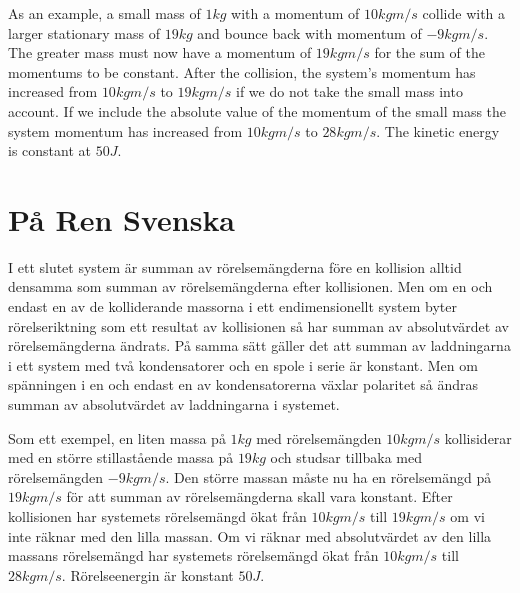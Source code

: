 As an example, a small mass of $1 kg$ with a momentum of $10 kgm/s$ collide with a larger stationary mass of $19 kg$ and bounce back with momentum of $-9 kgm/s$.
The greater mass must now have a momentum of $19 kgm/s$ for the sum of the momentums to be constant.
After the collision, the system's momentum has increased from $10 kgm/s$ to $19 kgm/s$ if we do not take the small mass into account.
If we include the absolute value of the momentum of the small mass the system momentum has increased from $10 kgm/s$ to $28 kgm/s$.
The kinetic energy is constant at $50 J$.

\section{På Ren Svenska}

I ett slutet system är summan av rörelsemängderna före en kollision alltid densamma som summan av rörelsemängderna efter kollisionen.
Men om en och endast en av de kolliderande massorna i ett endimensionellt system byter rörelseriktning som ett resultat av kollisionen så har summan av absolutvärdet av rörelsemängderna ändrats.
På samma sätt gäller det att summan av laddningarna i ett  system med två kondensatorer och en spole i serie är konstant.
Men om spänningen i en och endast en av kondensatorerna växlar polaritet så ändras summan av absolutvärdet av laddningarna i systemet.

Som ett exempel, en liten massa på $1 kg$ med rörelsemängden $10 kgm/s$ kollisiderar med en större stillastående massa på $19 kg$ och studsar tillbaka med rörelsemängden $-9 kgm/s$.
Den större massan måste nu ha en rörelsemängd på $19 kgm/s$ för att summan av rörelsemängderna skall vara konstant.
Efter kollisionen har systemets rörelsemängd ökat från $10 kgm/s$ till $19 kgm/s$ om vi inte räknar med den lilla massan.
Om vi räknar med absolutvärdet av den lilla massans rörelsemängd har systemets rörelsemängd ökat från $10 kgm/s$ till $28 kgm/s$.
Rörelseenergin är konstant $50 J$.

